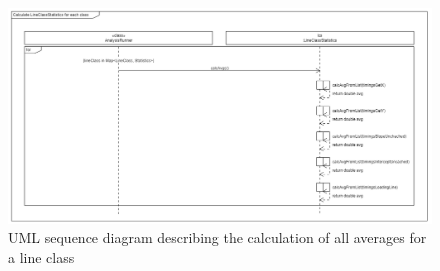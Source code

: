 \begin{landscape}
    \begin{figure}
        \begin{center}
            \includegraphics[width=1.75\textwidth, height=0.99\textheight]{img/sequence_lcs_avgs.png}
            \caption{UML sequence diagram describing the calculation of all averages for a line class}
            \label{fig:seq_slope_intercept}
        \end{center}
    \end{figure}
\end{landscape}
